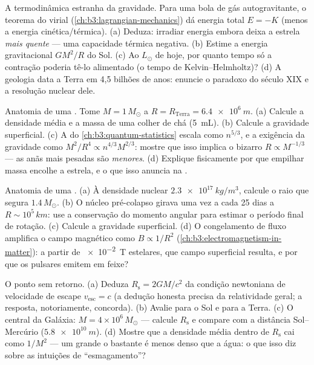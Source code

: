 \begin{exercise}[$\star\star$]\label{exo:b3:astrophysics:5}
A termodinâmica estranha da gravidade. Para uma bola de gás
autogravitante, o teorema do virial (\cref{ch:b3:lagrangian-mechanics})
dá energia total $E = -K$ (menos a energia cinética/térmica).
(a) Deduza: irradiar energia embora deixa a estrela \emph{mais quente}
--- uma capacidade térmica negativa. (b) Estime a energia
gravitacional $GM^2/R$ do Sol. (c) Ao $L_\odot$ de hoje, por quanto tempo
só a contração poderia tê-lo alimentado (o tempo de
Kelvin--Helmholtz)? (d) A geologia data a Terra em 4,5 bilhões de anos:
enuncie o paradoxo do século XIX e a resolução nuclear dele.
\end{exercise}

\begin{exercise}[$\star\star$]\label{exo:b3:astrophysics:6}
Anatomia de uma . Tome $M = 1\,M_\odot$ a
$R = R_{\text{Terra}} = \qty{6.4e6}{m}$. (a) Calcule a densidade
média e a massa de uma colher de chá (\qty{5}{mL}). (b) Calcule a
gravidade superficial. (c) A  do
\cref{ch:b3:quantum-statistics} escala como $n^{5/3}$, e a exigência da
gravidade como $M^2/R^4 \propto n^{4/3}M^{2/3}$: mostre que isso implica
o bizarro $R \propto M^{-1/3}$ --- as anãs mais pesadas são
\emph{menores}. (d) Explique fisicamente por que empilhar massa
encolhe a estrela, e o que isso anuncia na .
\end{exercise}

\begin{exercise}[$\star\star$]\label{exo:b3:astrophysics:7}
Anatomia de uma . (a) À densidade nuclear
$\qty{2.3e17}{kg/m^3}$, calcule o raio que segura
$1.4\,M_\odot$. (b) O núcleo pré-colapso girava uma vez a cada 25 dias
a $R \sim 10^5\,\unit{km}$: use a conservação do momento angular
para estimar o período final de rotação. (c) Calcule a gravidade
superficial. (d) O congelamento de fluxo amplifica o campo magnético como
$B \propto 1/R^2$ (\cref{ch:b3:electromagnetism-in-matter}):
a partir de \qty{e-2}{T} estelares, que campo superficial resulta, e
por que os pulsares emitem em feixe?
\end{exercise}

\begin{exercise}[$\star\star$]\label{exo:b3:astrophysics:8}
O ponto sem retorno. (a) Deduza $R_{\text{s}} = 2GM/c^2$ da
condição newtoniana de velocidade de escape $v_{\text{esc}} = c$ (a
dedução honesta precisa da relatividade geral; a resposta,
notoriamente, concorda). (b) Avalie para o Sol e para a Terra.
(c) O  central da Galáxia: $M = 4\times10^6\,M_\odot$
--- calcule $R_{\text{s}}$ e compare com a distância
Sol--Mercúrio ($\qty{5.8e10}{m}$). (d) Mostre que a densidade média dentro
de $R_{\text{s}}$ cai como $1/M^2$ --- um  grande o bastante é
menos denso que a água: o que isso diz sobre as intuições de
``esmagamento''?
\end{exercise}

